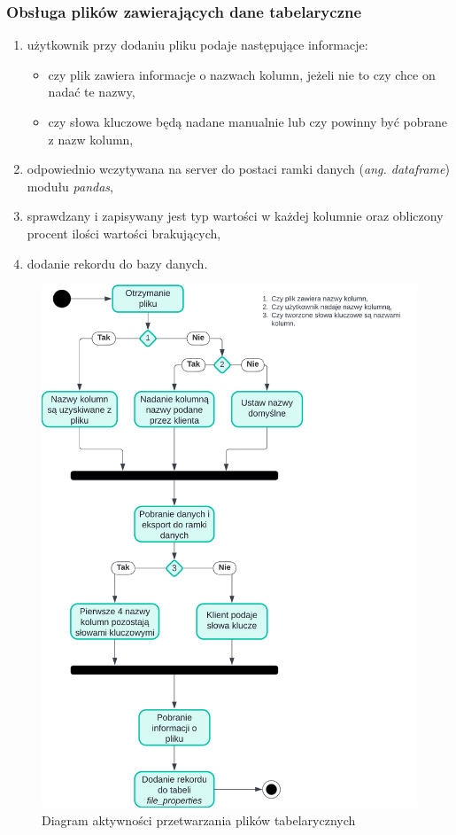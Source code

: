 \documentclass[12pt,a4paper,twoside]{article}
\begin{document}
\subsubsection{Obsługa plików zawierających dane tabelaryczne}
\begin{enumerate}
	\item użytkownik przy dodaniu pliku podaje następujące informacje:
	\begin{itemize}
		\item czy plik zawiera informacje o nazwach kolumn, jeżeli nie to czy chce on nadać te nazwy,
		\item czy słowa kluczowe będą nadane manualnie lub czy powinny być pobrane z nazw kolumn,
	\end{itemize}
	\item odpowiednio wczytywana na server do postaci ramki danych (\textit{ang. dataframe}) modułu \textit{pandas},
	\item sprawdzany i zapisywany jest typ wartości w każdej kolumnie oraz obliczony procent ilości wartości brakujących,
	\item dodanie rekordu do bazy danych.
\end{enumerate}
\begin{figure}[h!]
\centering
  \includegraphics[width=\textwidth]{img/csvac.png}
  \caption{Diagram aktywności przetwarzania plików tabelarycznych}
\end{figure}
\clearpage
\newpage
\end{document}
